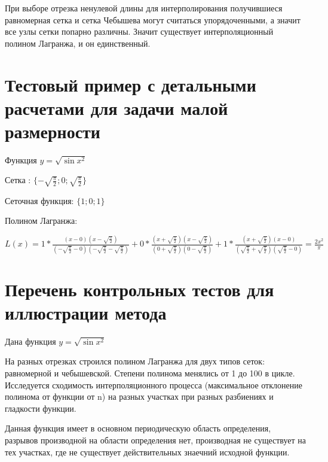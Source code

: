 При выборе отрезка ненулевой длины для интерполирования получившиеся равномерная сетка и сетка Чебышева могут считаться упорядоченными, а значит все узлы сетки попарно различны. Значит существует интерполяционный полином Лагранжа, и он единственный. 

\section{Тестовый пример с детальными расчетами для задачи малой размерности}

Функция \begin{math} 
	y=\sqrt{\sin{x^{2}}}
\end{math}

Сетка : 
\begin{math} 
	\{-\sqrt{\frac{\pi}{2}};0;\sqrt{\frac{\pi}{2}}\}
\end{math}

Сеточная функция: 
\begin{math} 
	\{1;0;1\}
\end{math}

Полином Лагранжа: 

\begin{math} 
	L(x)=1*\frac{(x-0)(x-\sqrt{\frac{\pi}{2}})}{(-\sqrt{\frac{\pi}{2}}-0)(-\sqrt{\frac{\pi}{2}}-\sqrt{\frac{\pi}{2}})}+0*\frac{(x+\sqrt{\frac{\pi}{2}})(x-\sqrt{\frac{\pi}{2}})}{(0+\sqrt{\frac{\pi}{2}})(0-\sqrt{\frac{\pi}{2}})}+1*\frac{(x+\sqrt{\frac{\pi}{2}})(x-0)}{(\sqrt{\frac{\pi}{2}}+\sqrt{\frac{\pi}{2}})(\sqrt{\frac{\pi}{2}}-0)}=\frac{2x^{2}}{\pi}
\end{math}

\section{Перечень контрольных тестов для иллюстрации метода}

Дана функция 
\begin{math} 
	y=\sqrt{\sin{x^{2}}}
\end{math}

На разных отрезках строился полином Лагранжа для двух типов сеток: равномерной и чебышевской. Степени полинома менялись от 1 до 100 в цикле. Исследуется сходимость интерполяционного процесса (максимальное отклонение полинома от функции от n) на разных участках при разных разбиениях и гладкости функции. 

Данная функция имеет в основном периодическую область определения, разрывов производной на области определения нет, производная не существует на тех участках, где не существует действительных знаечний исходной функции. 

